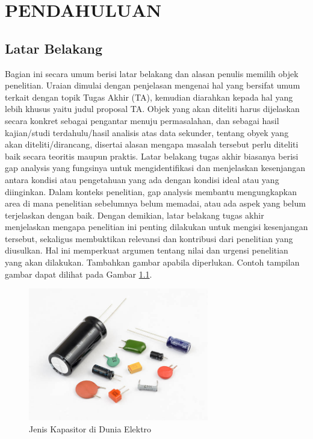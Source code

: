\chapter{PENDAHULUAN}

\section{Latar Belakang}
Bagian ini secara umum berisi latar belakang dan alasan penulis memilih objek penelitian. Uraian dimulai dengan penjelasan mengenai hal yang bersifat umum terkait dengan topik Tugas Akhir (TA), kemudian diarahkan kepada hal yang lebih khusus yaitu judul proposal TA. Objek yang akan diteliti harus dijelaskan secara konkret sebagai pengantar menuju permasalahan, dan sebagai hasil kajian/studi terdahulu/hasil analisis atas data sekunder, tentang obyek yang akan diteliti/dirancang, disertai alasan mengapa masalah tersebut perlu diteliti baik secara teoritis maupun praktis. 
Latar belakang tugas akhir biasanya berisi gap analysis yang fungsinya untuk mengidentifikasi dan menjelaskan kesenjangan antara kondisi atau pengetahuan yang ada dengan kondisi ideal atau yang diinginkan. Dalam konteks penelitian, gap analysis membantu mengungkapkan area di mana penelitian sebelumnya belum memadai, atau ada aspek yang belum terjelaskan dengan baik. Dengan demikian, latar belakang tugas akhir menjelaskan mengapa penelitian ini penting dilakukan untuk mengisi kesenjangan tersebut, sekaligus membuktikan relevansi dan kontribusi dari penelitian yang diusulkan. Hal ini memperkuat argumen tentang nilai dan urgensi penelitian yang akan dilakukan. Tambahkan gambar apabila diperlukan. Contoh tampilan gambar dapat dilihat pada Gambar \ref{fig:kapasitor}.


\begin{figure}[h!]
    \centering
    \includegraphics[width=0.7\textwidth]{gambar/kapasitor.jpg}
    \caption{Jenis Kapasitor di Dunia Elektro}
    \label{fig:kapasitor}
\end{figure}

